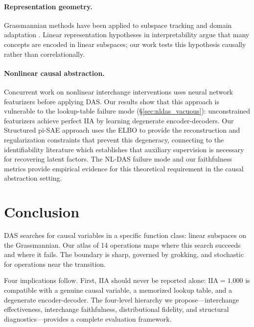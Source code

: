 \documentclass{article}
\newcommand{\IIA}{\mathrm{IIA}}
\begin{document}
\paragraph{Representation geometry.}
Grassmannian methods have been applied to subspace tracking and domain adaptation
\citep{edelman1998geometry, gopalan2011domain}. Linear representation hypotheses
in interpretability \citep{marks2023geometry, engels2024language,
park2024linear} argue that many concepts are encoded in linear subspaces; our
work tests this hypothesis causally rather than correlationally.

\paragraph{Nonlinear causal abstraction.}
Concurrent work on nonlinear interchange interventions
\citep{geiger2024causal} uses neural network featurizers before applying DAS.
Our results show that this approach is vulnerable to the lookup-table failure
mode (\S\ref{sec:nldas_vacuous}): unconstrained featurizers achieve perfect IIA
by learning degenerate encoder-decoders. Our Structured pi-SAE approach uses the
ELBO to provide the reconstruction and regularization constraints that prevent
this degeneracy, connecting to the identifiability literature
\citep{khemakhem2020variational, sutter2020multimodal} which establishes that
auxiliary supervision is necessary for recovering latent factors. The NL-DAS
failure mode and our faithfulness metrics provide empirical evidence for this
theoretical requirement in the causal abstraction setting.


\section{Conclusion}
\label{sec:conclusion}

DAS searches for causal variables in a specific function class: linear subspaces
on the Grassmannian. Our atlas of 14 operations maps where this search succeeds
and where it fails. The boundary is sharp, governed by grokking, and stochastic
for operations near the transition.

Four implications follow. First, IIA should never be reported alone:
$\IIA = 1.000$ is compatible with a genuine causal variable, a memorized lookup
table, and a degenerate encoder-decoder. The four-level hierarchy we propose---interchange effectiveness, interchange faithfulness, distributional fidelity,
and structural diagnostics---provides a complete evaluation framework.
\end{document}
